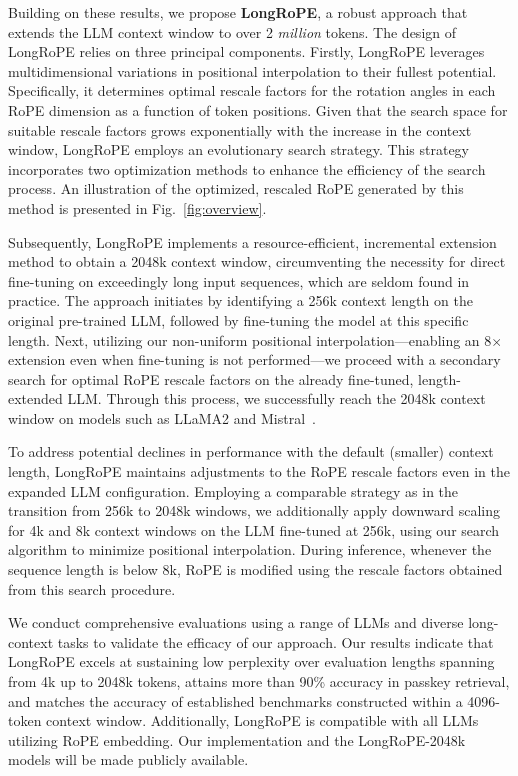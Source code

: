 Building on these results, we propose \textbf{LongRoPE}, a robust approach that extends the LLM context window to over 2 \emph{million} tokens. The design of LongRoPE relies on three principal components. Firstly, {LongRoPE} leverages multidimensional variations in positional interpolation to their fullest potential. Specifically, it determines optimal rescale factors for the rotation angles in each RoPE dimension as a function of token positions. Given that the search space for suitable rescale factors grows exponentially with the increase in the context window, {LongRoPE} employs an evolutionary search strategy. This strategy incorporates two optimization methods to enhance the efficiency of the search process. An illustration of the optimized, rescaled RoPE generated by this method is presented in Fig.~\ref{fig:overview}.

Subsequently, {LongRoPE} implements a resource-efficient, incremental extension method to obtain a 2048k context window, circumventing the necessity for direct fine-tuning on exceedingly long input sequences, which are seldom found in practice. The approach initiates by identifying a 256k context length on the original pre-trained LLM, followed by fine-tuning the model at this specific length. Next, utilizing our non-uniform positional interpolation—enabling an 8$\times$ extension even when fine-tuning is not performed—we proceed with a secondary search for optimal RoPE rescale factors on the already fine-tuned, length-extended LLM. Through this process, we successfully reach the 2048k context window on models such as LLaMA2 and Mistral~\cite{mistral}.

To address potential declines in performance with the default (smaller) context length, {LongRoPE} maintains adjustments to the RoPE rescale factors even in the expanded LLM configuration. Employing a comparable strategy as in the transition from 256k to 2048k windows, we additionally apply downward scaling for 4k and 8k context windows on the LLM fine-tuned at 256k, using our search algorithm to minimize positional interpolation. During inference, whenever the sequence length is below 8k, RoPE is modified using the rescale factors obtained from this search procedure.

We conduct comprehensive evaluations using a range of LLMs and diverse long-context tasks to validate the efficacy of our approach. Our results indicate that LongRoPE excels at sustaining low perplexity over evaluation lengths spanning from 4k up to 2048k tokens, attains more than 90\% accuracy in passkey retrieval, and matches the accuracy of established benchmarks constructed within a 4096-token context window. Additionally, LongRoPE is compatible with all LLMs utilizing RoPE embedding. Our implementation and the LongRoPE-2048k models will be made publicly available.

